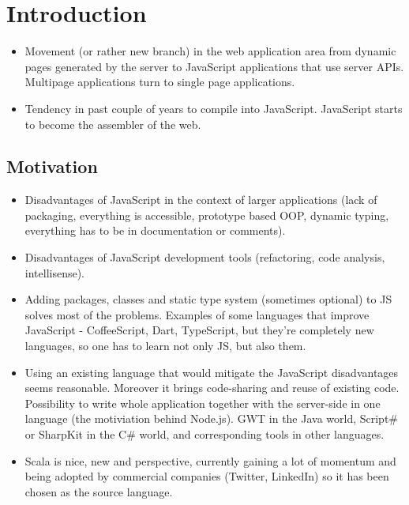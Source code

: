 \documentclass[12pt,a4paper]{report}
\begin{document}
\newpage
\pagestyle{plain}
\setcounter{page}{1}
\tableofcontents



\chapter{Introduction}

\begin{itemize}
\item Movement (or rather new branch) in the web application area from dynamic pages generated by the server to JavaScript applications that use server APIs. Multipage applications turn to single page applications.
\item Tendency in past couple of years to compile into JavaScript. JavaScript starts to become the assembler of the web.
\end{itemize}

\section{Motivation}

\begin{itemize}
\item Disadvantages of JavaScript in the context of larger applications (lack of packaging, everything is accessible, prototype based OOP, dynamic typing, everything has to be in documentation or comments).
\item Disadvantages of JavaScript development tools (refactoring, code analysis, intellisense).
\item Adding packages, classes and static type system (sometimes optional) to JS solves most of the problems. Examples of some languages that improve JavaScript - CoffeeScript, Dart, TypeScript, but they're completely new languages, so one has to learn not only JS, but also them.
\item Using an existing language that would mitigate the JavaScript disadvantages seems reasonable. Moreover it brings code-sharing and reuse of existing code. Possibility to write whole application together with the server-side in one language (the motiviation behind Node.js). GWT in the Java world, Script\# or SharpKit in the C\# world, and corresponding tools in other languages.
\item Scala is nice, new and perspective, currently gaining a lot of momentum and being adopted by commercial companies (Twitter, LinkedIn) so it has been chosen as the source language.
\end{itemize}
\end{document}
